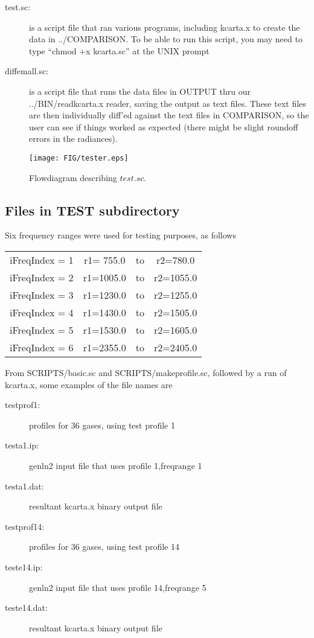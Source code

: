\documentclass[11pt]{article}
\begin{document}
\begin{description}
\item[test.sc:] is a script file that ran various programs,
  including kcarta.x to create the data in ../COMPARISON.  To be
  able to run this script, you may need to type ``chmod +x
  kcarta.sc'' at the UNIX prompt

\item[diffemall.sc:] is a script file that runs the data files in OUTPUT
  thru our ../BIN/readkcarta.x reader, saving the output as text files.
  These text files are then individually diff'ed against the text files
  in COMPARISON, so the user can see if things worked as expected (there
  might be slight roundoff errors in the radiances).
\end{description}

\begin{figure}
\texttt{[image: FIG/tester.eps]}
\caption{Flowdiagram describing $test.sc$.}
\end{figure}

\subsection{Files in TEST subdirectory}

Six frequency ranges were used for testing purposes, as follows

\medskip
\begin{tabular}{cccc}
iFreqIndex = 1 &      r1= 755.0 & to &   r2=780.0 \\
iFreqIndex = 2 &      r1=1005.0 & to &   r2=1055.0\\
iFreqIndex = 3 &      r1=1230.0 & to &   r2=1255.0\\
iFreqIndex = 4 &      r1=1430.0 & to &   r2=1505.0\\
iFreqIndex = 5 &      r1=1530.0 & to &   r2=1605.0\\
iFreqIndex = 6 &      r1=2355.0 & to &   r2=2405.0\\
\end{tabular}

\bigskip
From SCRIPTS/basic.sc and SCRIPTS/makeprofile.sc, followed by a run of
kcarta.x, some examples of the file names are

\begin{description}
\item[testprof1:]   profiles for 36 gases, using test profile 1
\item[testa1.ip:]   genln2 input file that uses profile 1,freqrange 1
\item[testa1.dat:]  resultant kcarta.x binary output file
\item[testprof14:]  profiles for 36 gases, using test profile 14
\item[teste14.ip:]  genln2 input file that uses profile 14,freqrange 5
\item[teste14.dat:] resultant kcarta.x binary output file
\end{description}
\end{document}
